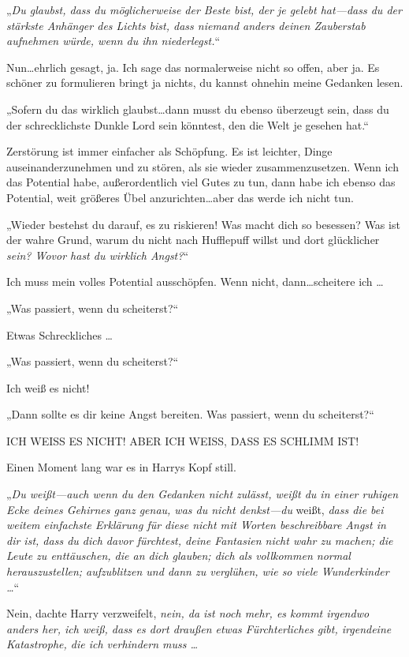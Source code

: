 {„\emph{Du glaubst, dass du möglicherweise der Beste bist, der je gelebt hat—dass du der stärkste Anhänger des Lichts bist, dass niemand anders deinen Zauberstab aufnehmen würde, wenn du ihn niederlegst.}“

Nun…ehrlich gesagt, ja. Ich sage das normalerweise nicht so offen, aber ja. Es schöner zu formulieren bringt ja nichts, du kannst ohnehin meine Gedanken lesen.

„Sofern du das wirklich glaubst…dann musst du ebenso überzeugt sein, dass du der schrecklichste Dunkle Lord sein könntest, den die Welt je gesehen hat.“

Zerstörung ist immer einfacher als Schöpfung. Es ist leichter, Dinge auseinanderzunehmen und zu stören, als sie wieder zusammenzusetzen. Wenn ich das Potential habe, außerordentlich viel Gutes zu tun, dann habe ich ebenso das Potential, weit größeres Übel anzurichten…aber das werde ich nicht tun.

„Wieder bestehst du darauf, es zu riskieren! Was macht dich so besessen? Was ist der wahre Grund, warum du nicht nach Hufflepuff willst und dort glücklicher \emph{sein? Wovor hast du wirklich Angst?}“

Ich muss mein volles Potential ausschöpfen. Wenn nicht, dann…scheitere ich …

„Was passiert, wenn du scheiterst?“

Etwas Schreckliches …

„Was passiert, wenn du scheiterst?“

Ich weiß es nicht!

„Dann sollte es dir keine Angst bereiten. Was passiert, wenn du scheiterst?“

ICH WEISS ES NICHT! ABER ICH WEISS, DASS ES SCHLIMM IST!

Einen Moment lang war es in Harrys Kopf still.

„\emph{Du weißt—auch wenn du den Gedanken nicht zulässt, weißt du in einer ruhigen Ecke deines Gehirnes ganz genau, was du nicht denkst—du} weißt, \emph{dass die bei weitem einfachste Erklärung für diese nicht mit Worten beschreibbare Angst in dir ist, dass du dich davor fürchtest, deine Fantasien nicht wahr zu machen; die Leute zu enttäuschen, die an dich glauben; dich als vollkommen normal herauszustellen; aufzublitzen und dann zu verglühen, wie so viele Wunderkinder …}“

Nein, dachte Harry verzweifelt, \emph{nein, da ist noch mehr, es kommt irgendwo anders her, ich weiß, dass es dort draußen etwas Fürchterliches gibt, irgendeine Katastrophe, die ich verhindern muss …}

}
